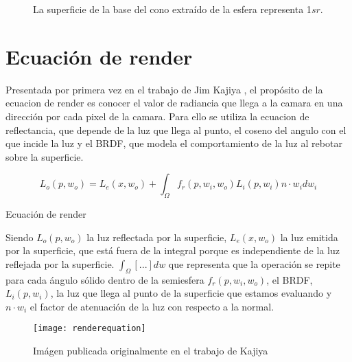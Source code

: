         \begin{figure}[H]
            \vspace{0.5cm}
            \centering
            \caption{La superficie de la base del cono extra\'ido de la esfera representa 1$sr$.}
            \vspace{0.5cm}
        \end{figure}

\section{Ecuaci\'on de render}
Presentada por primera vez en el trabajo de Jim Kajiya \autocite{kajiya}, el prop\'osito de la ecuacion de render es conocer el valor de
radiancia que llega a la camara en una direcci\'on por cada pixel de la camara. Para ello se utiliza la ecuacion de reflectancia,
que depende de la luz que llega al punto, el coseno del angulo con el que incide la luz y el BRDF, que modela el comportamiento
de la luz al rebotar sobre la superficie.\\

\begin{eqfloat}[!htb]
    \begin{equation}
        L_o(p, w_o) = L_e(x, w_o) + \int_\Omega{f_r(p, w_i, w_o) L_i(p, w_i) n\cdot{w_i}dw_i}
    \end{equation}
  \caption{Ecuaci\'on de render}
\end{eqfloat}
\singlespacing

Siendo $L_o(p, w_o)$ la luz reflectada por la superficie, $L_e(x, w_o)$ la luz emitida por la superficie, que est\'a fuera
de la integral porque es independiente de la luz reflejada por la superficie. $\int_{\Omega}[...]dw$ que representa
que la operaci\'on se repite para cada \'angulo s\'olido dentro de la semiesfera $f_r(p, w_i, w_o)$, el BRDF, $L_i(p, w_i)$, la luz
que llega al punto de la superficie que estamos evaluando y $n\cdot{w_i}$ el factor de atenuaci\'on de la luz con respecto a la normal.\\

\begin{figure}[H]
    \vspace{0.5cm}
    \centering
    \texttt{[image: renderequation]}
    \caption{Im\'agen publicada originalmente en el trabajo de Kajiya \autocite{kajiya}}
    \vspace{0.5cm}
\end{figure}

